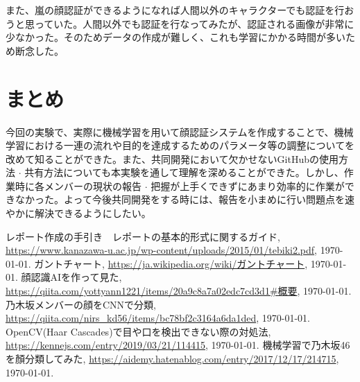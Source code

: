 \documentclass[a4paper, 11pt, titlepage]{jsarticle}
\begin{document}
また、嵐の顔認証ができるようになれば人間以外のキャラクターでも認証を行おうと思っていた。人間以外でも認証を行なってみたが、認証される画像が非常に少なかった。そのためデータの作成が難しく、これも学習にかかる時間が多いため断念した。

\section{まとめ}
今回の実験で、実際に機械学習を用いて顔認証システムを作成することで、機械学習における一連の流れや目的を達成するためのパラメータ等の調整についてを改めて知ることができた。また、共同開発において欠かせないGitHubの使用方法 $\cdot$ 共有方法についても本実験を通して理解を深めることができた。しかし、作業時に各メンバーの現状の報告 $\cdot$ 把握が上手くできずにあまり効率的に作業ができなかった。よって今後共同開発をする時には、報告を小まめに行い問題点を速やかに解決できるようにしたい。

\begin{thebibliography}{n}
  レポート作成の手引き　レポートの基本的形式に関するガイド, \url{https://www.kanazawa-u.ac.jp/wp-content/uploads/2015/01/tebiki2.pdf}, \today.
	ガントチャート, \url{https://ja.wikipedia.org/wiki/ガントチャート}, \today.
	顔認識AIを作って見た, \url{https://qiita.com/yottyann1221/items/20a9c8a7a02edc7cd3d1#概要}, \today.
	乃木坂メンバーの顔をCNNで分類, \url{https://qiita.com/nirs_kd56/items/bc78bf2c3164a6da1ded}, \today.
	OpenCV(Haar Cascades)で目や口を検出できない際の対処法, \url{https://kennejs.com/entry/2019/03/21/114415}, \today.
	機械学習で乃木坂46を顏分類してみた, \url{https://aidemy.hatenablog.com/entry/2017/12/17/214715}, \today.


\end{thebibliography}
\end{document}
